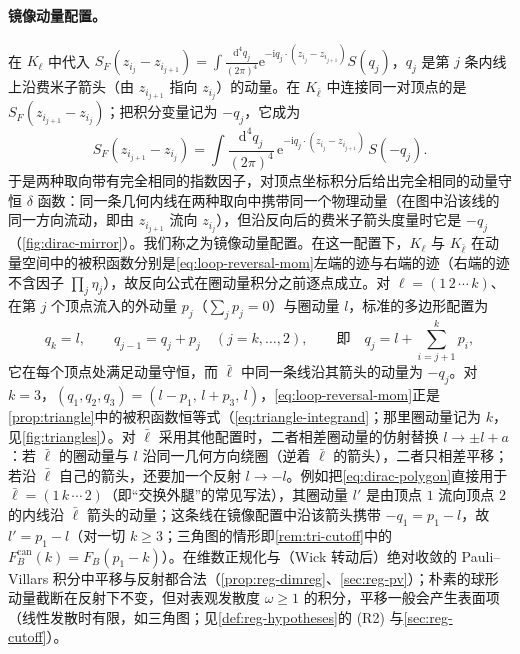 \documentclass[UTF8,a4paper,11pt,fontset=fandol]{ctexart}
\theoremstyle{cplain}
\theoremstyle{cdefinition}
\theoremstyle{cremark}
\numberwithin{equation}{section}
\newcommand{\dd}{\mathrm{d}}                         %
\newcommand{\SF}{S_{F}}                              %
\newcommand{\ii}{\mathrm{i}}                        %
\newcommand{\ee}{\mathrm{e}}                        %
\begin{document}
\paragraph{镜像动量配置。}在 $K_\ell$ 中代入 $\SF(z_{i_j}-z_{i_{j+1}})=\int\frac{\dd^4q_j}{(2\pi)^4}\ee^{-\ii q_j\cdot(z_{i_j}-z_{i_{j+1}})}S(q_j)$，$q_j$ 是第 $j$ 条内线上沿费米子箭头（由 $z_{i_{j+1}}$ 指向 $z_{i_j}$）的动量。在 $K_{\bar\ell}$ 中连接同一对顶点的是 $\SF(z_{i_{j+1}}-z_{i_j})$；把积分变量记为 $-q_j$，它成为
\[
\SF(z_{i_{j+1}}-z_{i_j})=\int\!\frac{\dd^4q_j}{(2\pi)^4}\,\ee^{-\ii q_j\cdot(z_{i_j}-z_{i_{j+1}})}\,S(-q_j).
\]
于是两种取向带有完全相同的指数因子，对顶点坐标积分后给出完全相同的动量守恒 $\delta$ 函数：同一条几何内线在两种取向中携带同一个物理动量（在图中沿该线的同一方向流动，即由 $z_{i_{j+1}}$ 流向 $z_{i_j}$），但沿反向后的费米子箭头度量时它是 $-q_j$（\cref{fig:dirac-mirror}）。我们称之为镜像动量配置。在这一配置下，$K_\ell$ 与 $K_{\bar\ell}$ 在动量空间中的被积函数分别是\cref{eq:loop-reversal-mom}左端的迹与右端的迹（右端的迹不含因子 $\prod_j\eta_j$），故反向公式在圈动量积分之前逐点成立。对 $\ell=(1\,2\,\cdots\,k)$、在第 $j$ 个顶点流入的外动量 $p_j$（$\sum_jp_j=0$）与圈动量 $l$，标准的多边形配置为
\begin{equation}\label{eq:dirac-polygon}
q_k=l,\qquad q_{j-1}=q_j+p_j\quad(j=k,\dots,2),\qquad\text{即}\quad q_j=l+\sum_{i=j+1}^{k}p_i ,
\end{equation}
它在每个顶点处满足动量守恒，而 $\bar\ell$ 中同一条线沿其箭头的动量为 $-q_j$。对 $k=3$，$(q_1,q_2,q_3)=(l-p_1,\,l+p_3,\,l)$，\cref{eq:loop-reversal-mom}正是\cref{prop:triangle}中的被积函数恒等式（\cref{eq:triangle-integrand}；那里圈动量记为 $k$，见\cref{fig:triangles}）。对 $\bar\ell$ 采用其他配置时，二者相差圈动量的仿射替换 $l\to\pm l+a$：若 $\bar\ell$ 的圈动量与 $l$ 沿同一几何方向绕圈（逆着 $\bar\ell$ 的箭头），二者只相差平移；若沿 $\bar\ell$ 自己的箭头，还要加一个反射 $l\to-l$。例如把\cref{eq:dirac-polygon}直接用于 $\bar\ell=(1\,k\,\cdots\,2)$（即“交换外腿”的常见写法），其圈动量 $l'$ 是由顶点 $1$ 流向顶点 $2$ 的内线沿 $\bar\ell$ 箭头的动量；这条线在镜像配置中沿该箭头携带 $-q_1=p_1-l$，故 $l'=p_1-l$（对一切 $k\ge3$；三角图的情形即\cref{rem:tri-cutoff}中的 $F_B^{\mathrm{can}}(k)=F_B(p_1-k)$）。在维数正规化与（Wick 转动后）绝对收敛的 Pauli--Villars 积分中平移与反射都合法（\cref{prop:reg-dimreg}、\cref{sec:reg-pv}）；朴素的球形动量截断在反射下不变，但对表观发散度 $\omega\ge1$ 的积分，平移一般会产生表面项（线性发散时有限，如三角图；见\cref{def:reg-hypotheses}的 (R2) 与\cref{sec:reg-cutoff}）。
\end{document}
